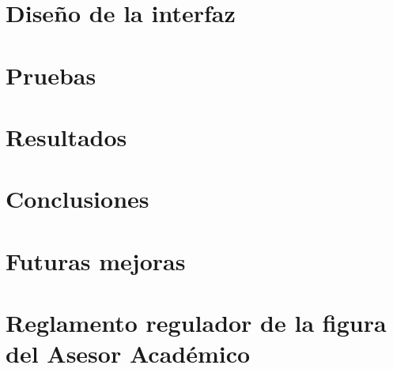 \documentclass[a4paper,12pt]{book}
\begin{document}
   \chapter{Diseño de la interfaz}
      
      
      

   \chapter{Pruebas}\label{pruebas}
      
      
      
      

   \chapter{Resultados}

   \chapter{Conclusiones}

   \chapter{Futuras mejoras}
    

   \listoffigures

   

   \appendix
   \chapter{Reglamento regulador de la figura del Asesor Académico}\label{a1}
   
\end{document}
